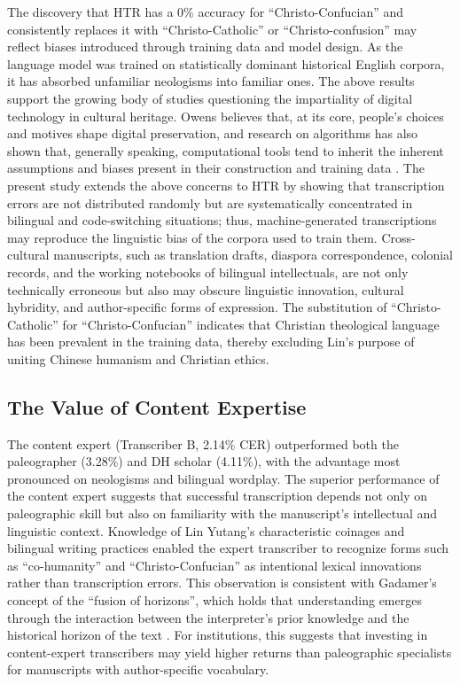 \documentclass[final]{anthology-ch} %
\begin{document}
The discovery that HTR has a 0\% accuracy for \enquote{Christo-Confucian} and consistently replaces it with \enquote{Christo-Catholic} or \enquote{Christo-confusion} may reflect biases introduced through training data and model design. As the language model was trained on statistically dominant historical English corpora, it has absorbed unfamiliar neologisms into familiar ones. The above results support the growing body of studies questioning the impartiality of digital technology in cultural heritage. Owens \cite{owens2018theory} believes that, at its core, people's choices and motives shape digital preservation, and research on algorithms has also shown that, generally speaking, computational tools tend to inherit the inherent assumptions and biases present in their construction and training data \cite{noble2018algorithms}. The present study extends the above concerns to HTR by showing that transcription errors are not distributed randomly but are systematically concentrated in bilingual and code-switching situations; thus, machine-generated transcriptions may reproduce the linguistic bias of the corpora used to train them. Cross-cultural manuscripts, such as translation drafts, diaspora correspondence, colonial records, and the working notebooks of bilingual intellectuals, are not only technically erroneous but also may obscure linguistic innovation, cultural hybridity, and author-specific forms of expression. The substitution of \enquote{Christo-Catholic} for \enquote{Christo-Confucian} indicates that Christian theological language has been prevalent in the training data, thereby excluding Lin's purpose of uniting Chinese humanism and Christian ethics.

\subsection{The Value of Content Expertise}

The content expert (Transcriber B, 2.14\% CER) outperformed both the paleographer (3.28\%) and DH scholar (4.11\%), with the advantage most pronounced on neologisms and bilingual wordplay. The superior performance of the content expert suggests that successful transcription depends not only on paleographic skill but also on familiarity with the manuscript's intellectual and linguistic context. Knowledge of Lin Yutang's characteristic coinages and bilingual writing practices enabled the expert transcriber to recognize forms such as \enquote{co-humanity} and \enquote{Christo-Confucian} as intentional lexical innovations rather than transcription errors. This observation is consistent with Gadamer's concept of the \enquote{fusion of horizons}, which holds that understanding emerges through the interaction between the interpreter's prior knowledge and the historical horizon of the text \cite{gadamer2013truth}. For institutions, this suggests that investing in content-expert transcribers may yield higher returns than paleographic specialists for manuscripts with author-specific vocabulary.
\end{document}
